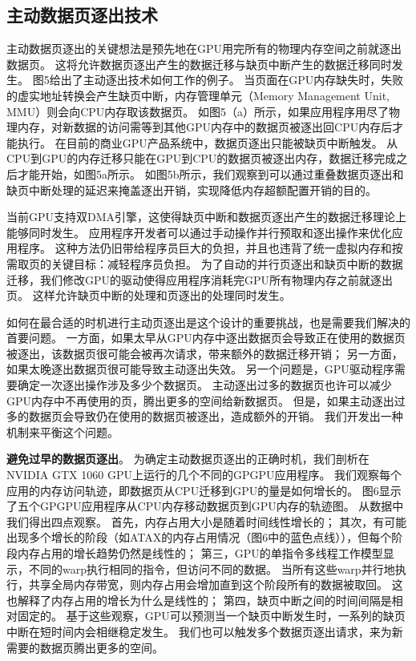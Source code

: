 \subsection{主动数据页逐出技术}

主动数据页逐出的关键想法是预先地在GPU用完所有的物理内存空间之前就逐出数据页。
这将允许数据页逐出产生的数据迁移与缺页中断产生的数据迁移同时发生。
图5给出了主动逐出技术如何工作的例子。
当页面在GPU内存缺失时，失败的虚实地址转换会产生缺页中断，内存管理单元（Memory Management Unit, MMU）则会向CPU内存取该数据页。
如图5（a）所示，如果应用程序用尽了物理内存，对新数据的访问需等到其他GPU内存中的数据页被逐出回CPU内存后才能执行。
在目前的商业GPU产品系统中，数据页逐出只能被缺页中断触发。
从CPU到GPU的内存迁移只能在GPU到CPU的数据页被逐出内存，数据迁移完成之后才能开始，如图5a所示。
如图5b所示，我们观察到可以通过重叠数据页逐出和缺页中断处理的延迟来掩盖逐出开销，实现降低内存超额配置开销的目的。

当前GPU支持双DMA引擎，这使得缺页中断和数据页逐出产生的数据迁移理论上能够同时发生。
应用程序开发者可以通过手动操作并行预取和逐出操作来优化应用程序。
这种方法仍旧带给程序员巨大的负担，并且也违背了统一虚拟内存和按需取页的关键目标：减轻程序员负担。
为了自动的并行页逐出和缺页中断的数据迁移，我们修改GPU的驱动使得应用程序消耗完GPU所有物理内存之前就逐出页。
这样允许缺页中断的处理和页逐出的处理同时发生。

如何在最合适的时机进行主动页逐出是这个设计的重要挑战，也是需要我们解决的首要问题。
一方面，如果太早从GPU内存中逐出数据页会导致正在使用的数据页被逐出，该数据页很可能会被再次请求，带来额外的数据迁移开销；
另一方面，如果太晚逐出数据页很可能导致主动逐出失效。
另一个问题是，GPU驱动程序需要确定一次逐出操作涉及多少个数据页。
主动逐出过多的数据页也许可以减少GPU内存中不再使用的页，腾出更多的空间给新数据页。
但是，如果主动逐出过多的数据页会导致仍在使用的数据页被逐出，造成额外的开销。
我们开发出一种机制来平衡这个问题。

\textbf{避免过早的数据页逐出}。
为确定主动数据页逐出的正确时机，我们剖析在NVIDIA GTX 1060 GPU上运行的几个不同的GPGPU应用程序。
我们观察每个应用的内存访问轨迹，即数据页从CPU迁移到GPU的量是如何增长的。
图6显示了五个GPGPU应用程序从CPU内存移动数据页到GPU内存的轨迹图。
从数据中我们得出四点观察。
首先，内存占用大小是随着时间线性增长的；
其次，有可能出现多个增长的阶段（如ATAX的内存占用情况（图6中的蓝色点线）），但每个阶段内存占用的增长趋势仍然是线性的；
第三，GPU的单指令多线程工作模型显示，不同的warp执行相同的指令，但访问不同的数据。
当所有这些warp并行地执行，共享全局内存带宽，则内存占用会增加直到这个阶段所有的数据被取回。
这也解释了内存占用的增长为什么是线性的；
第四，缺页中断之间的时间间隔是相对固定的。
基于这些观察，GPU可以预测当一个缺页中断发生时，一系列的缺页中断在短时间内会相继稳定发生。
我们也可以触发多个数据页逐出请求，来为新需要的数据页腾出更多的空间。

